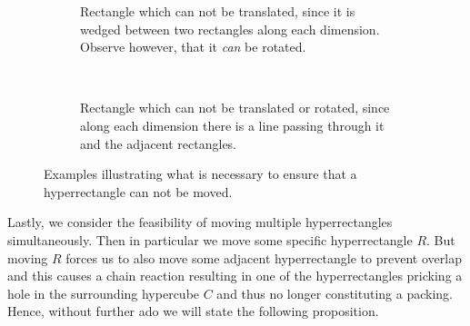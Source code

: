 \begin{figure}[ht]
    \centering
    \begin{subfigure}[b]{0.45\textwidth}
        \centering
        \caption{Rectangle which can not be translated, since it is wedged between two rectangles along each dimension. Observe however, that it \textit{can} be rotated.}
        \label{fig:wedged-and-loose}
    \end{subfigure}
    ~
    \begin{subfigure}[b]{0.45\textwidth}
        \centering
        \caption{Rectangle which can not be translated or rotated, since along each dimension there is a line passing through it and the adjacent rectangles.}
        \label{fig:wedged-with-line-fixed}
    \end{subfigure}
    \caption{Examples illustrating what is necessary to ensure that a hyperrectangle can not be moved.}
\end{figure}

\noindent Lastly, we consider the feasibility of moving multiple hyperrectangles simultaneously. Then in particular we move some specific hyperrectangle $R$. But moving $R$ forces us to also move some adjacent hyperrectangle to prevent overlap and this causes a chain reaction resulting in one of the hyperrectangles pricking a hole in the surrounding hypercube $C$ and thus no longer constituting a packing. Hence, without further ado we will state the following proposition.

